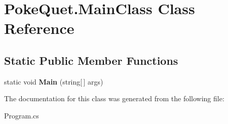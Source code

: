 \hypertarget{class_poke_quet_1_1_main_class}{}\section{Poke\+Quet.\+Main\+Class Class Reference}
\label{class_poke_quet_1_1_main_class}
\subsection*{Static Public Member Functions}
\begin{DoxyCompactItemize}
\item 
\mbox{\label{class_poke_quet_1_1_main_class_a2ee62877a52aedfd454133e9676efccb}} 
static void {\bfseries Main} (string\mbox{[}$\,$\mbox{]} args)
\end{DoxyCompactItemize}


The documentation for this class was generated from the following file\+:\begin{DoxyCompactItemize}
\item 
Program.\+cs\end{DoxyCompactItemize}
